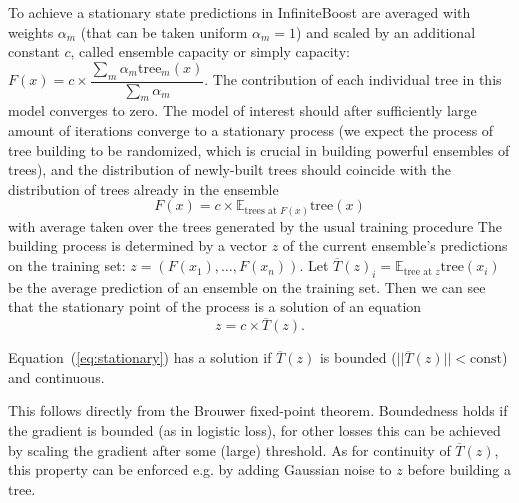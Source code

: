 To achieve a stationary state predictions in InfiniteBoost are averaged with weights $\alpha_m$
(that can be taken uniform $\alpha_m = 1$)
and scaled by an additional constant $c$, called ensemble capacity or simply capacity:
$ F(x) = c \times \dfrac{\sum_m \alpha_m \text{tree}_m(x)}{ \sum_m \alpha_m } $.
The contribution of each individual tree in this model converges to zero.
The model of interest should after sufficiently large amount of iterations converge to a stationary process
(we expect the process of tree building to be randomized, which is crucial in building powerful ensembles of trees),
and the distribution of newly-built trees should coincide with the distribution of trees already in the ensemble
\begin{equation*}
  F(x) = c \times \mathbb{E}_{\text{trees at }F(x)} \text{tree}(x)
\end{equation*}
with average taken over the trees generated by the usual training procedure
The building process is determined by a vector $z$ of the current ensemble's predictions on the training set:
$ z = ( F(x_1), \dots, F(x_n) ) $.
Let $ \overline{T}(z)_i = \mathbb{E}_\text{tree at $z$} \text{tree}(x_i) $ be the average prediction of an ensemble on the training set. Then we can see that the stationary point of the process is a solution of an equation
\begin{equation}
    z = c \times \overline{T}(z) \label{eq:stationary}.
\end{equation}

\begin{theorem}
Equation~(\ref{eq:stationary}) has a solution if  
$\overline{T}(z)$ is bounded ($|| \overline{T}(z) || < \text{const}$) and continuous.
\end{theorem}
This follows directly from the Brouwer fixed-point theorem.
Boundedness holds if the gradient is bounded (as in logistic loss),
for other losses this can be achieved by scaling the gradient after some (large) threshold.
As for continuity of $\overline{T}(z)$,
this property can be enforced e.g. by adding Gaussian noise to $z$ before building a tree.

